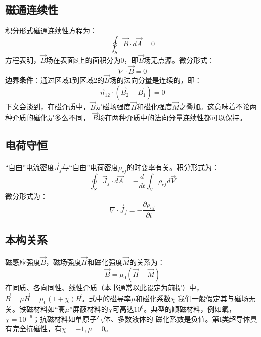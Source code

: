 \subsection{磁通连续性}
积分形式磁通连续性方程为：
\begin{equation}\label{eqn:bcontinuelaw}
\oint_S \vec{B}\cdot d\vec{A}=0
\end{equation}
方程表明，$\vec{B}$场在表面S上的面积分为0，即$\vec{B}$场无点源。微分形式：
\begin{equation}\label{eqn:bcontinuelaw diff}
  \nabla \cdot \vec{B}=0
\end{equation}
\textbf{边界条件}：通过区域1到区域2的$\vec{B}$场的法向分量是连续的，即：
\begin{equation}\label{eqn:bcontinuelaw bc}
  \vec{n}_{12}\cdot (\vec{B}_2-\vec{B}_1)=0
\end{equation}
下文会谈到，在磁介质中，$\vec{B}$是磁场强度$\vec{H}$和磁化强度$\vec{M}$之叠加。这意味着不论两种介质的磁化是多么不同，
$\vec{B}$场在两种介质中的法向分量连续性都可以保持。

\subsection{电荷守恒}
“自由”电流密度$\vec{J}_f$与“自由”电荷密度$\rho_{cf}$的时变率有关。积分形式为：
\begin{equation}\label{eqn:chargelaw}
\oint_S \vec{J}_f\cdot d\vec{A}=-\frac{d}{dt}\int_V \rho_{cf}d\vec{V}
\end{equation}
微分形式为：
\begin{equation}\label{eqn:chargelaw diff}
   \nabla \cdot \vec{J}_f=-\frac{\partial{\rho_{cf}}}{\partial{t}}
\end{equation}

\subsection{本构关系}
磁感应强度$\vec{B}$，磁场强度$\vec{H}$和磁化强度$\vec{M}$的关系为：
\begin{equation}\label{eqn:bhm}
\vec{B}=\mu_0(\vec{H}+\vec{M})
\end{equation}
在同质、各向同性、线性介质（本书通常以此设定为前提）中，$\vec{B}=\mu \vec{H}=\mu_0(1+\chi)\vec{H}$。式中的磁导率$\mu$和磁化系数$\chi$
我们一般假定其与磁场无关。铁磁材料如“高$\mu$”屏蔽材料的$\chi$可高达$10^6$。典型的顺磁材料，例如氧，$\chi=10^{-6}$；抗磁材料如单原子气体、多数液体的
磁化系数是负值。第I类超导体具有完全抗磁性，有$\chi=-1, \mu=0$。

